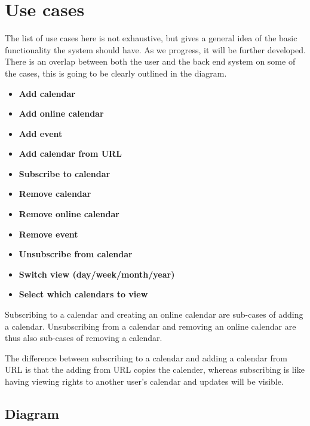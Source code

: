\documentclass[10pt]{report}
\numberwithin{equation}{section} %
\numberwithin{figure}{section} %
\numberwithin{table}{section} %
\begin{document}
\section{Use cases}
The list of use cases here is not exhaustive, but gives a general idea of the
basic functionality the system should have. As we progress, it will be further
developed. There is an overlap between both the user and the back end system on
some of the cases, this is going to be clearly outlined in the diagram.
\begin{itemize}
\item \textbf{Add calendar}
\item \textbf{Add online calendar}
\item \textbf{Add event}
\item \textbf{Add calendar from URL}
\item \textbf{Subscribe to calendar}
\item \textbf{Remove calendar}
\item \textbf{Remove online calendar}
\item \textbf{Remove event}
\item \textbf{Unsubscribe from calendar}
\item \textbf{Switch view (day/week/month/year)}
\item \textbf{Select which calendars to view}
\end{itemize}

Subscribing to a calendar and creating an online calendar are sub-cases of adding a calendar. Unsubscribing from a calendar and removing an online calendar are thus also sub-cases of removing a calendar.

The difference between subscribing to a calendar and adding a calendar from URL is that the adding from URL copies the calender, whereas subscribing is like having viewing rights to another user's calendar and updates will be visible.

\subsection{Diagram}
\end{document}
